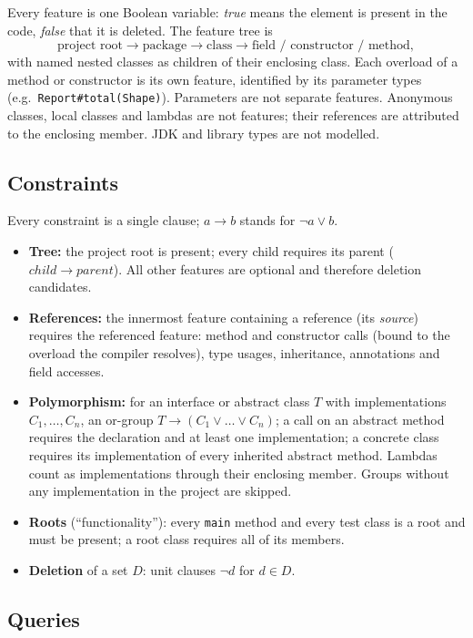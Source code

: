\documentclass[11pt,a4paper]{article}
\newcommand{\code}[1]{\texttt{#1}}
\begin{document}
Every feature is one Boolean variable: \emph{true} means the element is
present in the code, \emph{false} that it is deleted. The feature tree is
\[
  \text{project root} \to \text{package} \to \text{class}
  \to \text{field / constructor / method},
\]
with named nested classes as children of their enclosing class. Each
overload of a method or constructor is its own feature, identified by its
parameter types (e.g.\ \code{Report\#total(Shape)}). Parameters are not
separate features. Anonymous classes, local classes and lambdas are not
features; their references are attributed to the enclosing member. JDK and
library types are not modelled.

\subsection{Constraints}

Every constraint is a single clause; $a \to b$ stands for
$\neg a \lor b$.
\begin{itemize}
  \item \textbf{Tree:} the project root is present; every child requires its
        parent ($\mathit{child} \to \mathit{parent}$). All other features are
        optional and therefore deletion candidates.
  \item \textbf{References:} the innermost feature containing a reference
        (its \emph{source}) requires the referenced feature: method and
        constructor calls (bound to the overload the compiler resolves),
        type usages, inheritance, annotations and field accesses.
  \item \textbf{Polymorphism:} for an interface or abstract class $T$ with
        implementations $C_1,\dots,C_n$, an or-group
        $T \to (C_1 \lor \dots \lor C_n)$; a call on an abstract method
        requires the declaration and at least one implementation; a concrete
        class requires its implementation of every inherited abstract method.
        Lambdas count as implementations through their enclosing member.
        Groups without any implementation in the project are skipped.
  \item \textbf{Roots} (``functionality''): every \code{main} method and
        every test class is a root and must be present; a root class
        requires all of its members.
  \item \textbf{Deletion} of a set $D$: unit clauses $\neg d$ for
        $d \in D$.
\end{itemize}

\subsection{Queries}
\end{document}
